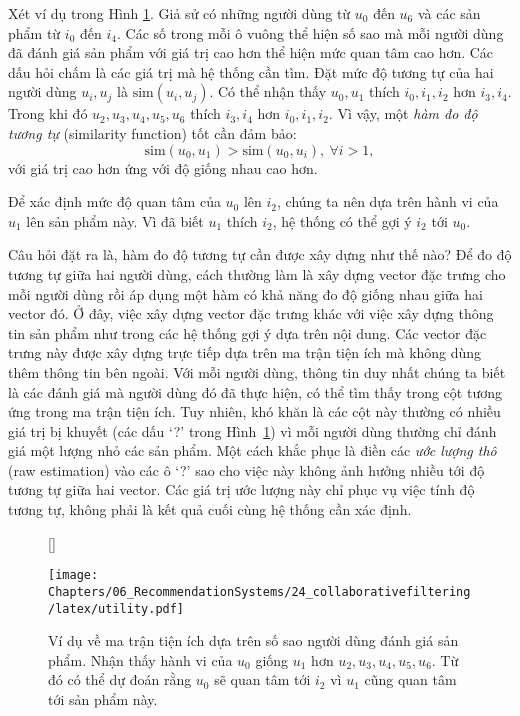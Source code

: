 Xét ví dụ trong Hình \ref{fig:24_1}. Giả sử có những người dùng từ $u_0$ đến
$u_6$ và các sản phẩm từ $i_0$ đến $i_4$.  Các số trong mỗi ô vuông thể hiện {số
sao} mà mỗi người dùng đã đánh giá sản phẩm với giá trị cao hơn thể hiện {mức
quan tâm} cao hơn. Các dấu hỏi chấm là các giá trị mà hệ thống cần tìm. Đặt {mức
độ tương tự} của hai người dùng $u_i, u_j$ là $\text{sim}(u_i, u_j)$. Có thể
nhận thấy $u_0, u_1$ {thích} $i_0, i_1, i_2$ hơn $i_3, i_4$. Trong khi đó $u_2,
u_3, u_4, u_5, u_6$ thích $i_3, i_4$ hơn $i_0, i_1, i_2$. Vì vậy, một
\textit{hàm đo độ tương tự} ({similarity function}) tốt cần đảm bảo:
\begin{equation}
\text{sim}(u_0, u_1) > \text{sim}(u_0, u_i), ~\forall i > 1,
\end{equation}
với giá trị cao hơn ứng với độ giống nhau cao hơn.

Để xác định {mức độ quan tâm} của $u_0$ lên $i_2$, chúng
ta nên dựa trên {hành vi} của $u_1$ lên sản phẩm này. Vì đã biết $u_1$ {thích} $i_2$, hệ thống có thể gợi ý $i_2$ tới $u_0$.

Câu hỏi đặt ra là, hàm đo độ tương tự cần được xây dựng như thế nào? Để đo độ
tương tự giữa hai người dùng, cách thường làm là xây dựng vector đặc trưng cho
mỗi người dùng rồi áp dụng một hàm có khả năng đo độ giống nhau giữa hai vector
đó. Ở đây, việc xây dựng vector đặc trưng khác với việc xây dựng thông tin sản
phẩm như trong các hệ thống gợi ý dựa trên nội dung. Các vector đặc trưng này
được xây dựng trực tiếp dựa trên ma trận tiện ích mà không dùng thêm thông tin
bên ngoài. Với mỗi người dùng, thông tin duy nhất chúng ta biết là các đánh giá
mà người dùng đó đã thực hiện, có thể tìm thấy trong cột tương ứng trong ma trận
tiện ích. Tuy nhiên, khó khăn là các cột này thường có nhiều giá trị bị khuyết
(các dấu `?' trong Hình~\ref{fig:24_1}) vì mỗi người dùng thường chỉ đánh giá
một lượng nhỏ các sản phẩm. Một cách khắc phục là điền các \textit{ước lượng
thô} (raw estimation) vào các ô `?' sao cho việc này không ảnh hưởng nhiều tới
{độ tương tự} giữa hai vector. Các giá trị ước lượng này chỉ phục vụ việc tính độ
tương tự, không phải là kết quả cuối cùng hệ thống cần xác định.
\begin{figure}[t]
[\FBwidth]
{\caption{
Ví dụ về ma trận tiện ích dựa trên số sao người dùng đánh giá
sản phẩm. Nhận thấy {hành vi} của $u_0$ giống $u_1$ hơn $u_2, u_3, u_4, u_5, u_6$. Từ đó có thể dự đoán rằng $u_0$ sẽ quan tâm tới $i_2$ vì $u_1$ cũng quan tâm tới sản phẩm này.
}
\label{fig:24_1}}
{ %
\texttt{[image: Chapters/06\_RecommendationSystems/24\_collaborativefiltering/latex/utility.pdf]}
}
\end{figure}

